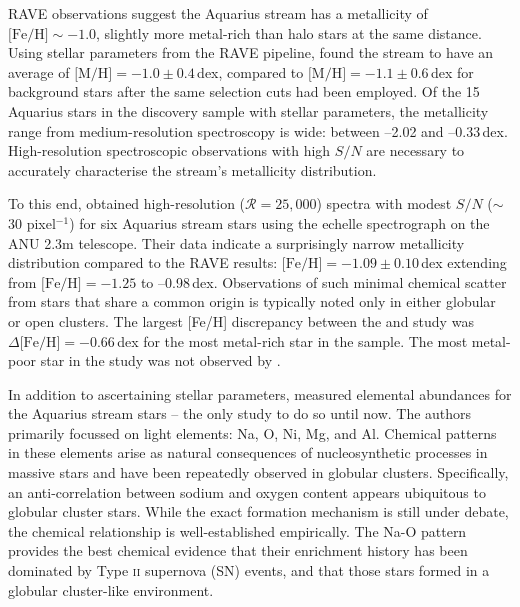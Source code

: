\documentclass{emulateapj}
\begin{document}
RAVE observations suggest the Aquarius stream has a metallicity of $\mbox{[Fe/H]} \sim -1.0$, slightly more metal-rich than halo stars at the same distance. Using stellar parameters from the RAVE pipeline, \citet{williams;et-al_2011} found the stream to have an average of ${\mbox{[M/H]} = -1.0 \pm 0.4}$\,dex, compared to ${\mbox{[M/H]} = -1.1 \pm 0.6}$\,dex for background stars after the same selection cuts had been employed. Of the 15 Aquarius stars in the \citet{williams;et-al_2011} discovery sample with stellar parameters, the metallicity range from medium-resolution spectroscopy is wide: between --2.02 and {--0.33\,dex}. High-resolution spectroscopic observations with high $S/N$ are necessary to accurately characterise the stream's metallicity distribution.

To this end, \citet{wylie-de-boer;et-al_2012} obtained high-resolution ($\mathcal{R} = 25,000$) spectra with modest $S/N$ ($\sim$30 pixel$^{-1}$) for six Aquarius stream stars using the echelle spectrograph on the ANU 2.3m telescope. Their data indicate a surprisingly  narrow metallicity distribution compared to the RAVE results: ${\mbox{[Fe/H]} = -1.09 \pm 0.10}$\,dex extending from ${\mbox{[Fe/H]} = -1.25}$ to {--0.98\,dex}. Observations of such minimal chemical scatter from stars that share a common origin is typically noted only in either globular or open clusters. The largest [Fe/H] discrepancy between the \citet{williams;et-al_2011} and \citet{wylie-de-boer;et-al_2012} study was ${\Delta\mbox{[Fe/H]} = -0.66}$\,dex for the most metal-rich star in the \citet{williams;et-al_2011} sample. The most metal-poor star in the \citet{williams;et-al_2011} study was not observed by \citet{wylie-de-boer;et-al_2012}. 

In addition to ascertaining stellar parameters, \citet{wylie-de-boer;et-al_2012} measured elemental abundances for the Aquarius stream stars -- the only study to do so until now. The authors primarily focussed on light elements: Na, O, Ni, Mg, and Al. Chemical patterns in these elements arise as natural consequences of nucleosynthetic processes in massive stars and have been repeatedly observed in globular clusters. Specifically, an anti-correlation between sodium and oxygen content appears ubiquitous to globular cluster stars. While the exact formation mechanism is still under debate, the chemical relationship is well-established empirically. The {Na-O} pattern provides the best chemical evidence that their enrichment history has been dominated by Type \textsc{ii} supernova (SN) events, and that those stars formed in a globular cluster-like environment.
\end{document}
